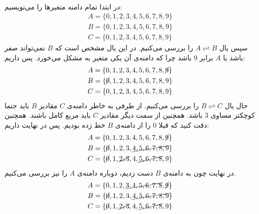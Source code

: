 \documentclass[]{article}
\begin{document}
\printheader

\\\noindent
در ابتدا تمام دامنه متغیر‌ها را می‌نویسیم:
\begin{gather*}
    A = \{0, 1, 2, 3, 4, 5, 6, 7, 8, 9\}\\
    B = \{0, 1, 2, 3, 4, 5, 6, 7, 8, 9\}\\
    C = \{0, 1, 2, 3, 4, 5, 6, 7, 8, 9\}
\end{gather*}
سپس یال
$A \rightleftharpoons B$
را بررسی می‌کنیم. در این یال مشخص است که
$B$
نمی‌تواند صفر باشد یا
$A$
برابر 9 باشد چرا که دامنه‌ی آن یکی متغیر به مشکل می‌خورد. پس داریم:
\begin{gather*}
    A = \{0, 1, 2, 3, 4, 5, 6, 7, 8, \cancel{9}\}\\
    B = \{\cancel{0}, 1, 2, 3, 4, 5, 6, 7, 8, 9\}\\
    C = \{0, 1, 2, 3, 4, 5, 6, 7, 8, 9\}
\end{gather*}
حال یال
$B \rightleftharpoons C$
را بررسی می‌کنیم.
از طرفی به خاطر دامنه‌ی
$C$
مقادیر
$B$
باید حتما کوچکتر مساوی 3 باشد. همچنین از سمت دیگر مقادیر
$C$
باید مربع کامل باشند. همچنین دقت کنید که قبلا 0 را از دامنه‌ی $B$ خط زده بودیم. پس در نهایت داریم:
\begin{gather*}
    A = \{0, 1, 2, 3, 4, 5, 6, 7, 8, \cancel{9}\}\\
    B = \{\cancel{0}, 1, 2, 3, \cancel{4, 5, 6, 7, 8, 9}\}\\
    C = \{\cancel{0}, 1, \cancel{2, 3}, 4, \cancel{5, 6, 7, 8}, 9\}
\end{gather*}
در نهایت چون به دامنه‌ی
$B$
دست زدیم، دوباره دامنه‌ی
$A$
را نیز بررسی می‌کنیم.
\begin{gather*}
    A = \{0, 1, 2, \cancel{3, 4, 5, 6, 7, 8}, \cancel{9}\}\\
    B = \{\cancel{0}, 1, 2, 3, \cancel{4, 5, 6, 7, 8, 9}\}\\
    C = \{\cancel{0}, 1, \cancel{2, 3}, 4, \cancel{5, 6, 7, 8}, 9\}
\end{gather*}
\end{document}
